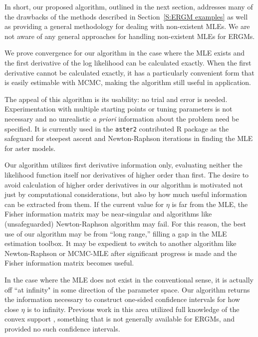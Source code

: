 In short, our proposed algorithm, outlined in the next section,
 addresses many of the drawbacks of the methods
described in Section~\ref{S:ERGM examples} as well as providing a general methodology
for dealing with non-existent MLEs.  We are not aware of any general approaches for
handling non-existent MLEs for ERGMs.  

We prove convergence for our algorithm in the case where the MLE exists and the first 
derivative of the log likelihood can be calculated exactly.
When the first derivative cannot be calculated exactly, 
it has a particularly convenient form that is 
easily estimable with MCMC, making the algorithm still useful in application.

The appeal of this algorithm is its usability: no trial and error is needed.  
Experimentation with multiple starting points or tuning parameters is not necessary 
and no unrealistic \emph{a priori} information about the problem need be specified.  
It is currently used in the \texttt{aster2} contributed R package 
\citep{aster:R} as the safeguard for steepest ascent and Newton-Raphson
 iterations in finding the MLE for aster models.

Our algorithm utilizes first derivative information only, evaluating 
neither the likelihood function itself nor derivatives of higher order than first.
The desire to avoid calculation of higher order derivatives in our algorithm
is motivated not just by 
computational considerations, but 
also by how much useful information can be extracted from them.   
If the current value for $\eta$ is far from the MLE,  
the Fisher information matrix may be near-singular and algorithms like (unsafeguarded) 
Newton-Raphson algorithm may fail.  
For this 
reason, the best use of our algorithm may be from ``long range,'' filling a gap in the MLE estimation toolbox.  It may 
be expedient to switch to another algorithm like Newton-Raphson or MCMC-MLE 
after significant progress is made and the Fisher information matrix becomes useful.  

In the case where the MLE does not exist in the conventional sense, 
it is actually off ``at infinity" in some direction of the parameter space.
Our algorithm returns the information necessary to construct one-sided confidence 
intervals for how close $\eta$ is to infinity.  
Previous work in this area utilized full knowledge
of the convex support \citep{Handcock:degeneracy,Rinaldo:2009}, something
that is not generally available for ERGMs, and provided no such confidence intervals.

